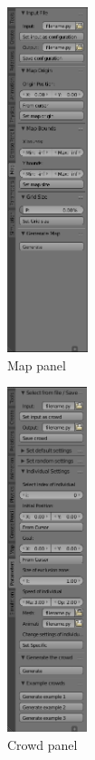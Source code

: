 \begin{figure} \centering
  \begin{subfigure}[t]{0.2\textwidth}
    \includegraphics[height=10cm]{img/GUI_map_example.png}
    \caption{Map panel}
  \end{subfigure} %
  \begin{subfigure}[t]{0.2\textwidth}
    \includegraphics[height=10cm]{img/GUI_crowd_example.png}
    \caption{Crowd panel}
  \end{subfigure} %
  \begin{subfigure}[t]{0.5\textwidth}

\end{subfigure}
\end{figure}
